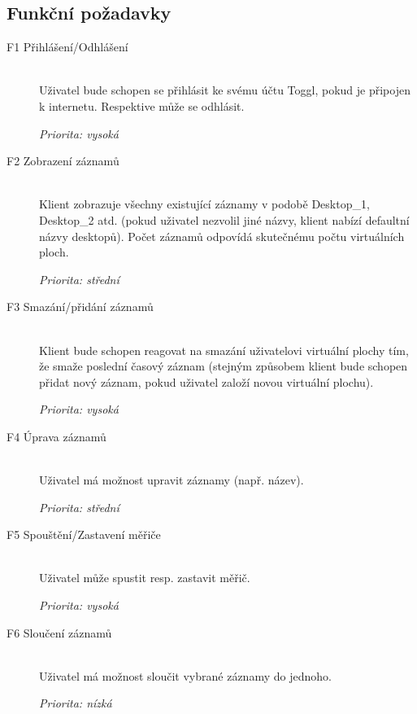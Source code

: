 \documentclass[thesis=B,czech]{FITthesis}[2012/06/26]
\begin{document}
\subsection{Funkční požadavky}
\begin{description} 
	\item[F1 Přihlášení/Odhlášení] \hspace*{\fill} \\
	Uživatel bude schopen se přihlásit ke svému účtu Toggl, pokud je připojen k internetu.
	Respektive může se odhlásit. \par
	\textit{Priorita: vysoká}
	
	\item[F2 Zobrazení záznamů] \hspace*{\fill} \\
	Klient zobrazuje všechny existující záznamy v podobě Desktop\_1, Desktop\_2 atd. (pokud uživatel nezvolil jiné názvy, klient nabízí defaultní názvy desktopů). Počet záznamů odpovídá skutečnému počtu virtuálních ploch.
	\par
	\textit{Priorita: střední}
	
	\item[F3 Smazání/přidání záznamů] \hspace*{\fill} \\
	Klient bude schopen reagovat na smazání uživatelovi virtuální plochy tím, že smaže poslední časový záznam (stejným způsobem klient bude schopen přidat nový záznam, pokud uživatel založí novou virtuální plochu). 
	\par
	\textit{Priorita: vysoká}
	
	\item[F4 Úprava záznamů] \hspace*{\fill} \\
	Uživatel má možnost upravit záznamy (např. název).
	\par
	\textit{Priorita: střední}
	
	\item[F5 Spouštění/Zastavení měřiče] \hspace*{\fill} \\
	Uživatel může spustit resp. zastavit měřič.
	\par
	\textit{Priorita: vysoká}
	
	\item[F6 Sloučení záznamů] \hspace*{\fill} \\
	Uživatel má možnost sloučit vybrané záznamy do jednoho.
	\par
	\textit{Priorita: nízká}
	

\end{description}
\end{document}
